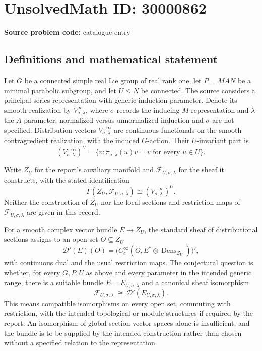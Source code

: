 \documentclass[11pt]{article}
\begin{document}
\section*{UnsolvedMath ID: 30000862}
\textbf{Source problem code:} catalogue entry
\subsection{Definitions and mathematical statement}
Let \(G\) be a connected simple real Lie group of real rank one, let \(P=MAN\) be a minimal parabolic subgroup, and let \(U\leq N\) be connected. The source considers a principal-series representation with generic induction parameter. Denote its smooth realization by \(V_{\sigma,\lambda}^{\infty}\), where \(\sigma\) records the inducing \(M\)-representation and \(\lambda\) the \(A\)-parameter; normalized versus unnormalized induction and \(\sigma\) are not specified. Distribution vectors \(V_{\sigma,\lambda}^{-\infty}\) are continuous functionals on the smooth contragredient realization, with the induced \(G\)-action. Their \(U\)-invariant part is
\[
 (V_{\sigma,\lambda}^{-\infty})^U
 =\{v:\pi_{\sigma,\lambda}(u)v=v\text{ for every }u\in U\}.
\]

Write \(Z_U\) for the report's auxiliary manifold and \(\mathscr F_{U,\sigma,\lambda}\) for the sheaf it constructs, with the stated identification
\[
 \Gamma(Z_U,\mathscr F_{U,\sigma,\lambda})
 \cong (V_{\sigma,\lambda}^{-\infty})^U.
\]
Neither the construction of \(Z_U\) nor the local sections and restriction maps of \(\mathscr F_{U,\sigma,\lambda}\) are given in this record.

For a smooth complex vector bundle \(E\to Z_U\), the standard sheaf of distributional sections assigns to an open set \(O\subseteq Z_U\)
\[
 \mathscr D'(E)(O)=
 \bigl(C_c^\infty(O,E^*\otimes\operatorname{Dens}_{Z_U})\bigr)',
\]
with continuous dual and the usual restriction maps. The conjectural question is whether, for every \(G,P,U\) as above and every parameter in the intended generic range, there is a suitable bundle \(E=E_{U,\sigma,\lambda}\) and a canonical sheaf isomorphism
\[
 \mathscr F_{U,\sigma,\lambda}\ \cong\ \mathscr D'(E_{U,\sigma,\lambda}).
\]
This means compatible isomorphisms on every open set, commuting with restriction, with the intended topological or module structures if required by the report. An isomorphism of global-section vector spaces alone is insufficient, and the bundle is to be supplied by the intended construction rather than chosen without a specified relation to the representation.
\end{document}
